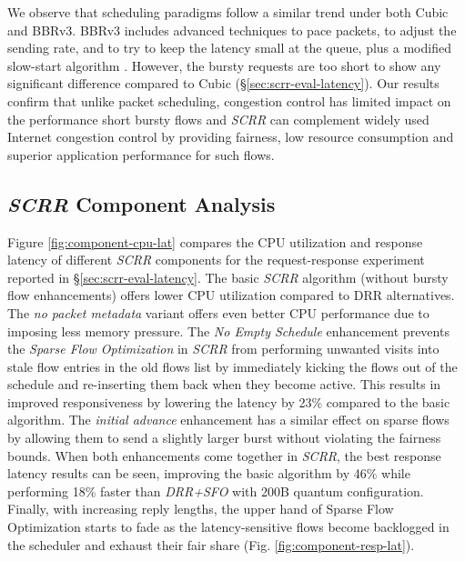 
We observe that scheduling paradigms follow a similar trend under both
Cubic and BBRv3. BBRv3 includes advanced techniques to pace packets,
to adjust the sending rate, and to try to keep the latency small at the
queue, plus a modified slow-start algorithm \cite{bbr3}. However, the
bursty requests are too short to show any significant difference compared to 
Cubic (\S\ref{sec:scrr-eval-latency}). Our results confirm that unlike
packet scheduling, congestion control has limited impact on the
performance short bursty flows and \textit{SCRR} can complement widely
used Internet congestion control by providing fairness, low resource
consumption and superior application performance for such flows.


\subsection{\textit{SCRR} Component Analysis}
\label{sec:scrr-component}




Figure \ref{fig:component-cpu-lat} compares the CPU utilization and response latency of different \textit{SCRR} components for the request-response experiment reported in \S\ref{sec:scrr-eval-latency}. 
The basic \textit{SCRR} algorithm (without bursty flow enhancements) offers lower CPU utilization compared to DRR alternatives. The \textit{no packet metadata} variant offers even better CPU performance due to imposing less memory pressure. The \textit{No Empty Schedule} enhancement prevents the \textit{Sparse Flow Optimization} in \textit{SCRR} from performing unwanted visits into stale flow entries in the old flows list by immediately kicking the flows out of the schedule and re-inserting them back when they become active. This results in improved responsiveness by lowering the latency by 23\% compared to the basic algorithm. The \textit{initial advance} enhancement has a similar effect on sparse flows by allowing them to send a slightly larger burst without violating the fairness bounds. When both enhancements come together in \textit{SCRR}, the best response latency results can be seen, improving the basic algorithm by 46\% while performing 18\% faster than \textit{DRR+SFO }with 200B quantum configuration. Finally, with increasing reply lengths, the upper hand of Sparse Flow Optimization starts to fade as the latency-sensitive flows become backlogged in the scheduler and exhaust their fair share (Fig. \ref{fig:component-resp-lat}).




